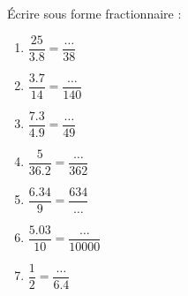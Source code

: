 
\begin{exercice}\label{exosmath-0868}

    Écrire sous forme fractionnaire :
    \begin{multicols}{2}
    \begin{enumerate}
        \item
            \( \dfrac{ 25 }{ 3.8 }=\dfrac{ \ldots }{ 38 }\)
        \item
            \( \dfrac{  3.7  }{  14  }=\dfrac{  \ldots  }{ 140 }\)
        \item
            \( \dfrac{  7.3  }{  4.9  }=\dfrac{  \ldots  }{ 49 }\)
        \item
            \( \dfrac{  5  }{  36.2  }=\dfrac{ \ldots   }{ 362 }\)
        \item
            \( \dfrac{  6.34  }{  9  }=\dfrac{  634  }{ \ldots }\)
        \item
            \( \dfrac{  5.03  }{  10  }=\dfrac{  \ldots  }{ 10000 }\)
        \item
            \( \dfrac{ 1 }{ 2 }=\dfrac{ \ldots }{ 6.4 }\)
    \end{enumerate}
    \end{multicols}


\end{exercice}
